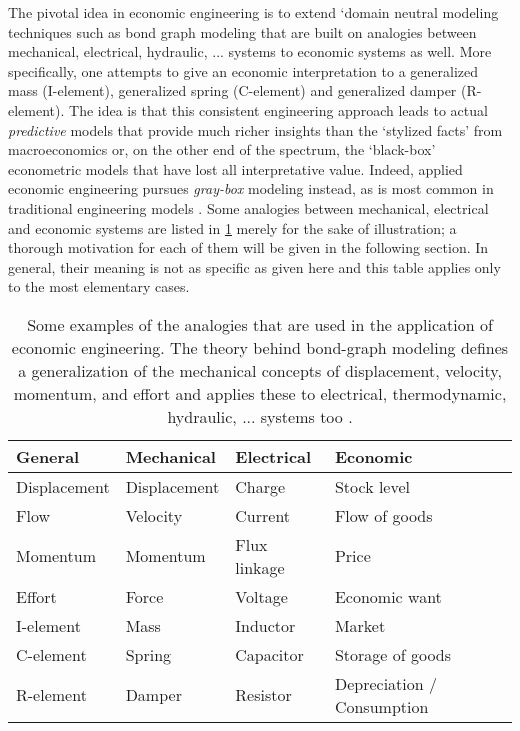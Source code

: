 The pivotal idea in economic engineering is to extend `domain neutral modeling techniques such as bond graph modeling \cite{Karnopp2012} that are built on analogies between mechanical, electrical, hydraulic, ... systems to economic systems as well. More specifically, one attempts to give an economic interpretation to a generalized mass (I-element), generalized spring (C-element) and generalized damper (R-element). The idea is that this consistent engineering approach leads to actual \emph{predictive} models that provide much richer insights than the `stylized facts' from macroeconomics or, on the other end of the spectrum, the `black-box' econometric models that have lost all interpretative value. Indeed, applied economic engineering pursues \emph{gray-box} modeling instead, as is most common in traditional engineering models \cite{Kruimer2021}. Some analogies between mechanical, electrical and economic systems are listed in \cref{tab:analogies} merely for the sake of illustration; a thorough motivation for each of them will be given in the following section.  In general, their meaning is not as specific as given here and this table applies only to the most elementary cases. 
\begin{table}[h]
    \centering
    \caption{Some examples of the analogies that are used in the application of economic engineering. The theory behind bond-graph modeling defines a generalization of the mechanical concepts of displacement, velocity, momentum, and effort and applies these to electrical, thermodynamic, hydraulic, ... systems too \cite{Karnopp2012}.}
    \label{tab:analogies}
    \begin{tabular}{llll}
        \toprule
        \textbf{General} & \textbf{Mechanical} & \textbf{Electrical} & \textbf{Economic} \\ 
        \midrule
        Displacement & Displacement & Charge & Stock level\\
        Flow & Velocity & Current & Flow of goods \\
        Momentum & Momentum & Flux linkage & Price \\
        Effort & Force & Voltage & Economic want \\
        \midrule
        I-element & Mass & Inductor & Market \\
        C-element & Spring & Capacitor & Storage of goods \\
        R-element & Damper & Resistor & Depreciation / Consumption \\
        \bottomrule
    \end{tabular}
\end{table}

